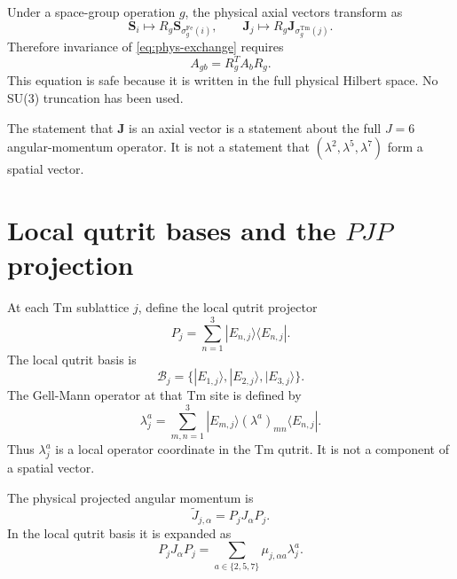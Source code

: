 \documentclass[11pt,a4paper]{article}
\newcommand{\Fe}{\mathrm{Fe}}
\newcommand{\Tm}{\mathrm{Tm}}
\newcommand{\ket}[1]{|#1\rangle}
\newcommand{\bra}[1]{\langle #1|}
\newcommand{\ve}[1]{\boldsymbol{#1}}
\begin{document}
Under a space-group operation $g$, the physical axial vectors transform as
\begin{equation}
  \ve S_i\mapsto R_g\ve S_{\sigma_g^\Fe(i)},
  \qquad
  \ve J_j\mapsto R_g\ve J_{\sigma_g^\Tm(j)}.
\end{equation}
Therefore invariance of \cref{eq:phys-exchange} requires
\begin{equation}
  \boxed{A_{gb}=R_g^T A_b R_g.}
  \label{eq:A-covariance}
\end{equation}
This equation is safe because it is written in the full physical Hilbert space.  No SU(3) truncation has been used.

\begin{warnbox}
The statement that $\ve J$ is an axial vector is a statement about the full $J=6$ angular-momentum operator.  It is not a statement that $(\lambda^2,\lambda^5,\lambda^7)$ form a spatial vector.
\end{warnbox}

\section{Local qutrit bases and the $PJP$ projection}

At each Tm sublattice $j$, define the local qutrit projector
\begin{equation}
  P_j=\sum_{n=1}^{3}\ket{E_{n,j}}\bra{E_{n,j}}.
\end{equation}
The local qutrit basis is
\begin{equation}
  \mathcal B_j=\{\ket{E_{1,j}},\ket{E_{2,j}},\ket{E_{3,j}}\}.
\end{equation}
The Gell-Mann operator at that Tm site is defined by
\begin{equation}
  \lambda_j^a
  =\sum_{m,n=1}^{3}\ket{E_{m,j}}(\lambda^a)_{mn}\bra{E_{n,j}}.
  \label{eq:local-lambda-def}
\end{equation}
Thus $\lambda_j^a$ is a local operator coordinate in the Tm qutrit.  It is not a component of a spatial vector.

The physical projected angular momentum is
\begin{equation}
  \widetilde J_{j,\alpha}=P_jJ_\alpha P_j.
\end{equation}
In the local qutrit basis it is expanded as
\begin{equation}
  \boxed{
  P_jJ_\alpha P_j
  =\sum_{a\in\{2,5,7\}}\mu_{j,\alpha a}\lambda_j^a .}
  \label{eq:PJP-local}
\end{equation}
\end{document}
